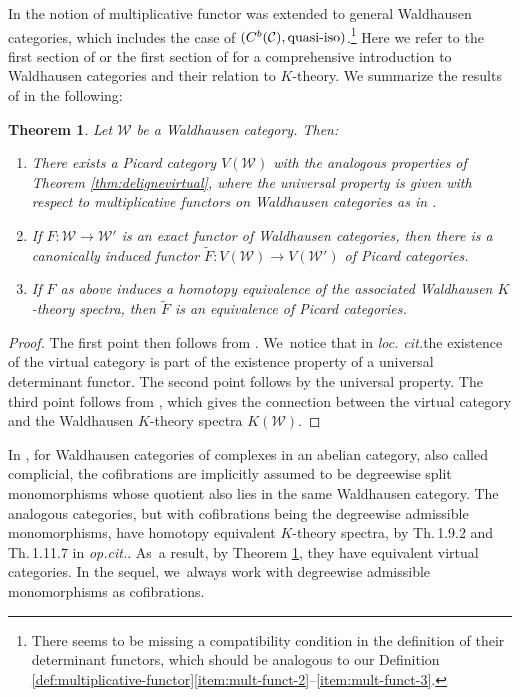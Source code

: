 \documentclass[11pt]{article}
\providecommand{\loccit}{\emph{loc. cit.}}
\theoremstyle{plain}
\newtheorem{theorem}{Theorem}[section]
\theoremstyle{definition}
\newcommand{\Ccal}{\mathcal C}
\newcommand{\Wcal}{\mathcal W}
\begin{document}
In \cite{Muro:determinant} the notion of multiplicative functor was extended to general Waldhausen categories, which includes the case of $(C^b(\Ccal), \hbox{quasi-iso})$.\footnote{There seems to be missing a compatibility condition in the definition of their determinant functors, which should be analogous to our Definition \ref{def:multiplicative-functor}\eqref{item:mult-funct-2}--\eqref{item:mult-funct-3}.} Here we refer to the first section of \cite{Waldhausen} or the first section of \cite{ThomasonTrobaugh} for a comprehensive introduction to Waldhausen categories and their relation to $K$-theory. We summarize the results of \cite{Muro:determinant} in the following:
\begin{theorem}\label{thm:Muro}
Let $\Wcal$ be a Waldhausen category. Then:
\begin{enumerate}
\item\label{item:Muro-1} There exists a Picard category $V(\Wcal)$ with the analogous properties of Theorem \ref{thm:delignevirtual}, where the universal property is given with respect to multiplicative functors on Waldhausen categories as in \cite[Def.\,1.2.3]{Muro:determinant}.
\item\label{item:Muro-2} If $F: \Wcal \to \Wcal'$ is an exact functor of Waldhausen categories, then there is a canonically induced functor $\widetilde{F}: V(\Wcal) \to V(\Wcal')$ of Picard categories.
\item\label{item:Muro-3} If $F$ as above induces a homotopy equivalence of the associated Waldhausen $K$-theory spectra, then $\widetilde{F}$ is an equivalence of Picard categories.
\end{enumerate}
\end{theorem}
\begin{proof}
The first point then follows from \cite[Th.\,4.3.4, Th.\,4.4.2, Cor.\,4.4.5]{Muro:determinant}. We~notice that in \loccit the existence of the virtual category is part of the existence property of a universal determinant functor. The second point follows by the universal property. The third point follows from \cite[Th.\,4.5.2]{Muro:determinant}, which gives the connection between the virtual category and the Waldhausen $K$-theory spectra $K(\Wcal)$.
\end{proof}

In \cite{ThomasonTrobaugh}, for Waldhausen categories of complexes in an abelian category, also called complicial, the cofibrations are implicitly assumed to be degreewise split monomorphisms whose quotient also lies in the same Waldhausen category. The analogous categories, but with cofibrations being the degreewise admissible monomorphisms, have homotopy equivalent $K$-theory spectra, by Th.\,1.9.2 and Th.\,1.11.7 in \emph{op.cit.}. As~a result, by Theorem \ref{thm:Muro}, they have equivalent virtual categories. In the sequel, we~always work with degreewise admissible monomorphisms as cofibrations.
\end{document}
